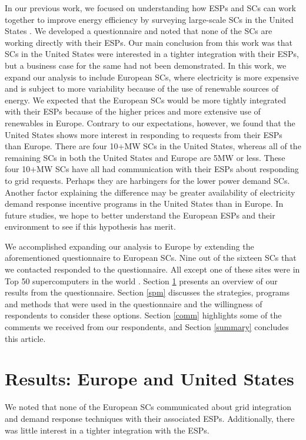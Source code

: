 \documentclass{llncs}
\begin{document}
In our previous work, we focused on understanding how ESPs and SCs can work together to improve energy efficiency by surveying large-scale SCs in the United States \cite{BatesESP}. We developed a questionnaire and noted that none of the SCs are working directly with their ESPs. Our main conclusion from this work was that SCs in the United States were interested in a tighter integration with their ESPs, but a business case for the same had not been demonstrated. In this work, we expand our analysis to include European SCs, where electricity is more expensive and is subject to more variability because of the use of renewable sources of energy. We expected that the European SCs would be more tightly integrated with their ESPs because of the higher prices and more extensive use of renewables in Europe.  Contrary to our expectations, however, we found that the United States shows more interest in responding to requests from their ESPs than Europe.  There are four 10+MW SCs in the United States, whereas all of the remaining SCs in both the United States and Europe are 5MW or less.  These four 10+MW SCs have all had communication with their ESPs about responding to grid requests.  Perhaps they are harbingers for the lower power demand SCs.  Another factor explaining the difference may be greater availability of electricity demand response incentive programs in the United States than in Europe. In future studies, we hope to better understand the European ESPs and their environment to see if this hypothesis has merit. 

We accomplished expanding our analysis to Europe by extending the aforementioned questionnaire to European SCs. Nine out of the sixteen SCs that we contacted responded to the questionnaire. All except one of these sites were in Top 50 supercomputers in the world \cite{Top500}. Section \ref{res} presents an overview of our results from the questionnaire. Section \ref{spm} discusses the strategies, programs and methods that were used in the questionnaire and the willingness of respondents to consider these options. Section \ref{comm} highlights some of the comments we received from our respondents, and Section \ref{summary} concludes this article.

\section{Results: Europe and United States}
\label{res}
We noted that none of the European SCs communicated about grid integration and demand response techniques with their associated ESPs. Additionally, there was little interest in a tighter integration with the ESPs.
\end{document}
